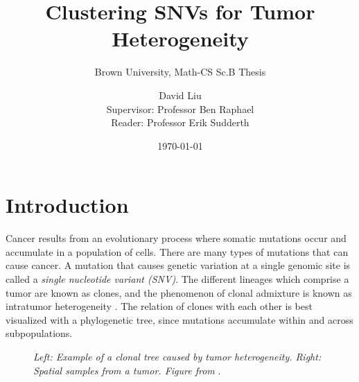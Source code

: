 \documentclass[11pt]{article}
\title{\vspace{2in}Clustering SNVs for Tumor Heterogeneity}
\subtitle{Brown University, Math-CS Sc.B Thesis}
\date{\today}
\author{David Liu \\ Supervisor: Professor Ben Raphael \\ Reader: Professor Erik Sudderth}
\begin{document}
\maketitle
\newpage
\tableofcontents
\section{Introduction}
Cancer results from an evolutionary process where somatic mutations occur and accumulate in a population of cells. There are many types of mutations that can cause cancer. A mutation that causes genetic variation at a single genomic site is called a \emph{single nucleotide variant (SNV)}. The different lineages which comprise a tumor are known as clones, and the phenomenon of clonal admixture is known as intratumor heterogeneity \cite{Nowell1976}. The relation of clones with each other is best visualized with a phylogenetic tree, since mutations accumulate within and across subpopulations.

\begin{figure}[h]
\par
{}%
\hspace{0.5in}
%
\par
\caption{\emph{Left: Example of a clonal tree caused by tumor heterogeneity. Right: Spatial samples from a tumor. Figure from} \cite{Ancestree}.}
\label{fig:Heterogeneity}
\end{figure}
\end{document}
